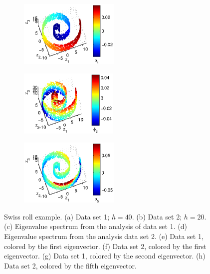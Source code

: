 \documentclass[preprint]{elsarticle}
\begin{document}
\begin{figure}[!th]
\begin{subfigure}{0.45\textwidth}
\caption{}
\end{subfigure}
\hfill
\begin{subfigure}{0.45\textwidth}
\centering
\includegraphics[height=1.25in]{swissroll2_color1}
\caption{}
\end{subfigure}
\hfill
\begin{subfigure}{0.45\textwidth}
\centering
\includegraphics[height=1.25in]{swissroll1_color2}
\caption{}
\end{subfigure}
\hfill
\begin{subfigure}{0.45\textwidth}
\centering
\includegraphics[height=1.25in]{swissroll2_color2}
\caption{}
\end{subfigure}
%
\caption{Swiss roll example. (a) Data set 1; $h= 40$. (b) Data set 2; $h = 20$. (c) Eigenvalue spectrum from the analysis of data set 1. (d) Eigenvalue spectrum from the analysis data set 2. (e) Data set 1, colored by the first eigenvector. (f) Data set 2, colored by the first eigenvector. (g) Data set 1, colored by the second eigenvector. (h) Data set 2, colored by the fifth eigenvector. } 
\label{fig:swiss_rolls}	
\end{figure}
\end{document}
